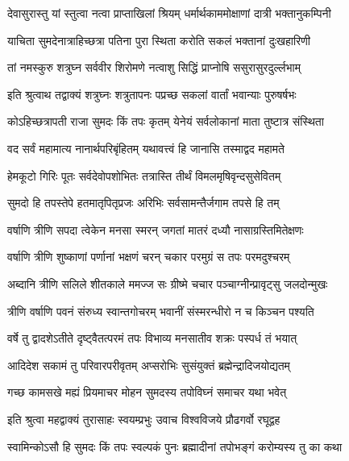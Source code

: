 \twolineshloka
{देवासुरास्तु यां स्तुत्वा नत्वा प्राप्ताखिलां श्रियम्}
{धर्मार्थकाममोक्षाणां दात्री भक्तानुकम्पिनी}%

\twolineshloka
{याचिता सुमदेनात्राहिच्छत्रा पतिना पुरा}
{स्थिता करोति सकलं भक्तानां दुःखहारिणी}%

\twolineshloka
{तां नमस्कुरु शत्रुघ्न सर्ववीर शिरोमणे}
{नत्वाशु सिद्धिं प्राप्नोषि ससुरासुरदुर्ल्लभाम्}%

\twolineshloka
{इति श्रुत्वाथ तद्वाक्यं शत्रुघ्नः शत्रुतापनः}
{पप्रच्छ सकलां वार्तां भवान्याः पुरुषर्षभः}%


\twolineshloka
{कोऽहिच्छत्रापती राजा सुमदः किं तपः कृतम्}
{येनेयं सर्वलोकानां माता तुष्टात्र संस्थिता}%

\twolineshloka
{वद सर्वं महामात्य नानार्थपरिबृंहितम्}
{यथावत्त्वं हि जानासि तस्माद्वद महामते}%


\twolineshloka
{हेमकूटो गिरिः पूतः सर्वदेवोपशोभितः}
{तत्रास्ति तीर्थं विमलमृषिवृन्दसुसेवितम्}%

\twolineshloka
{सुमदो हि तपस्तेपे हतमातृपितृप्रजः}
{अरिभिः सर्वसामन्तैर्जगाम तपसे हि तम्}%

\twolineshloka
{वर्षाणि त्रीणि सपदा त्वेकेन मनसा स्मरन्}
{जगतां मातरं दध्यौ नासाग्रस्तिमितेक्षणः}%

\twolineshloka
{वर्षाणि त्रीणि शुष्काणां पर्णानां भक्षणं चरन्}
{चकार परमुग्रं स तपः परमदुश्चरम्}%

\twolineshloka
{अब्दानि त्रीणि सलिले शीतकाले ममज्ज सः}
{ग्रीष्मे चचार पञ्चाग्नीन्प्रावृट्सु जलदोन्मुखः}%

\twolineshloka
{त्रीणि वर्षाणि पवनं संरुध्य स्वान्तगोचरम्}
{भवानीं संस्मरन्धीरो न च किञ्चन पश्यति}%

\twolineshloka
{वर्षे तु द्वादशेऽतीते दृष्ट्वैतत्परमं तपः}
{विभाव्य मनसातीव शक्रः पस्पर्ध तं भयात्}%

\twolineshloka
{आदिदेश सकामं तु परिवारपरीवृतम्}
{अप्सरोभिः सुसंयुक्तं ब्रह्मेन्द्रादिजयोद्यतम्}%

\twolineshloka
{गच्छ कामसखे मह्यं प्रियमाचर मोहन}
{सुमदस्य तपोविघ्नं समाचर यथा भवेत्}%

\twolineshloka
{इति श्रुत्वा महद्वाक्यं तुरासाहः स्वयम्प्रभुः}
{उवाच विश्वविजये प्रौढगर्वो रघूद्वह}%


\twolineshloka
{स्वामिन्कोऽसौ हि सुमदः किं तपः स्वल्पकं पुनः}
{ब्रह्मादीनां तपोभङ्गं करोम्यस्य तु का कथा}%

